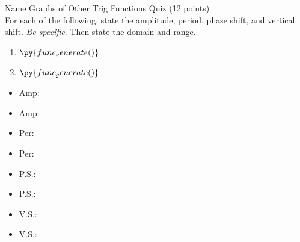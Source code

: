 \documentclass{article}
\begin{document}
\vfill 

Name \makebox[3in]{\hrulefill} \hfill Graphs of Other Trig Functions Quiz (12 points) \newline\\

For each of the following, state the amplitude, period, phase shift, and vertical shift. \emph{Be specific}.
Then state the domain and range.

\begin{multicols}{2}
\begin{enumerate}
    \item $\py{func_generate()}$
    \item $\py{func_generate()}$
\end{enumerate}
\end{multicols}
\vspace{0.1cm}
\begin{multicols}{2}
    \begin{itemize}
        \item Amp: \makebox[2in]{\hrulefill}
        \item Amp: \makebox[2in]{\hrulefill}
    \end{itemize}
\end{multicols}
\vspace{0.1cm}
\begin{multicols}{2}
    \begin{itemize}
        \item Per: \makebox[2in]{\hrulefill}
        \item Per: \makebox[2in]{\hrulefill}
    \end{itemize}
\end{multicols}
\vspace{0.1cm}
\begin{multicols}{2}
    \begin{itemize}
        \item P.S.: \makebox[2in]{\hrulefill}
        \item P.S.: \makebox[2in]{\hrulefill}
    \end{itemize}
\end{multicols}
\vspace{0.1cm}
\begin{multicols}{2}
    \begin{itemize}
        \item V.S.: \makebox[2in]{\hrulefill}
        \item V.S.: \makebox[2in]{\hrulefill}
    \end{itemize}
\end{multicols}
\end{document}
